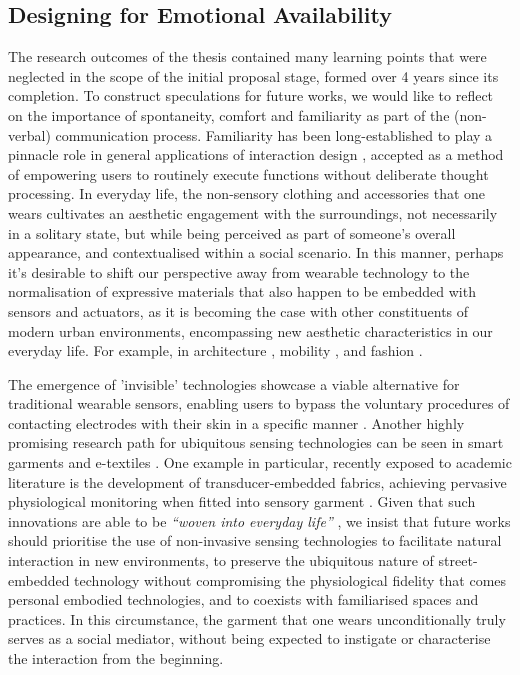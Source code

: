 \subsection{Designing for Emotional Availability}

The research outcomes of the thesis contained many learning points that were neglected in the scope of the initial proposal stage, formed over 4 years since its completion. To construct speculations for future works, we would like to reflect on the importance of spontaneity, comfort and familiarity as part of the (non-verbal) communication process. Familiarity has been long-established to play a pinnacle role in general applications of interaction design \cite{dix_starting_1998}, accepted as a method of empowering users to routinely execute functions without deliberate thought processing. In everyday life, the non-sensory clothing and accessories that one wears cultivates an aesthetic engagement with the surroundings, not necessarily in a solitary state, but while being perceived as part of someone's overall appearance, and contextualised within a social scenario. In this manner, perhaps it's desirable to shift our perspective away from wearable technology to the normalisation of expressive materials that also happen to be embedded with sensors and actuators, as it is becoming the case with other constituents of modern urban environments, encompassing new aesthetic characteristics in our everyday life. For example, in architecture \cite{alvarez_re-imagining_2017}, mobility \cite{nesmachnow_bus_2020}, and fashion \cite{buruk_snowflakes_2021,bang__olufsen_press_collaboration_2022}.

The emergence of 'invisible' technologies showcase a viable alternative for traditional wearable sensors, enabling users to bypass the voluntary procedures of contacting electrodes with their skin in a specific manner \cite{dos_santos_silva_design_2021}. Another highly promising research path for ubiquitous sensing technologies can be seen in smart garments and e-textiles \cite{jarusriboonchai_customisable_2019}. One example in particular, recently exposed to academic literature is the development of transducer-embedded fabrics, achieving pervasive physiological monitoring when fitted into sensory garment \cite{yan_single_2022}. Given that such innovations are able to be \textit{``woven into everyday life''} \cite{song_smart_2022}, we insist that future works should prioritise the use of non-invasive sensing technologies to facilitate natural interaction in new environments, to preserve the ubiquitous nature of street-embedded technology without compromising the physiological fidelity that comes personal embodied technologies, and to coexists with familiarised spaces and practices. In this circumstance, the garment that one wears unconditionally truly serves as a social mediator, without being expected to instigate or characterise the interaction from the beginning.

